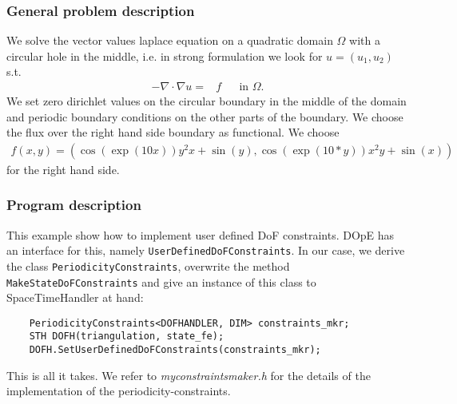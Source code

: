 \subsubsection{General problem description}
We solve the vector values laplace equation on a quadratic domain $\Omega$ with a circular hole in the middle, i.e. in strong formulation we look for $u=(u_1,u_2)$ s.t.
\begin{align*}
-\nabla \cdot \nabla u =& f &&\text{in }\Omega.
\end{align*}
We set zero dirichlet values on the circular boundary in the middle of the domain and periodic boundary conditions on the other parts of the boundary. We choose the flux over the right hand side boundary as functional. We choose
\begin{align*}
f(x,y) = \left(\cos\left(\exp(10  x)\right)  y^2x + \sin(y), \cos\left(\exp(10 * y)\right)x^2y + \sin(x)\right)
\end{align*}
for the right hand side.
\subsubsection{Program description}
This example show how to implement user defined DoF constraints. DOpE has an interface for this, namely \texttt{UserDefinedDoFConstraints}. In our case, we derive the class \texttt{PeriodicityConstraints}, overwrite the method \texttt{MakeStateDoFConstraints} and give an instance of this class to SpaceTimeHandler at hand:
\begin{verbatim}
 	PeriodicityConstraints<DOFHANDLER, DIM> constraints_mkr;
 	STH DOFH(triangulation, state_fe);
 	DOFH.SetUserDefinedDoFConstraints(constraints_mkr);
\end{verbatim}
This is all it takes. We refer to \textit{myconstraintsmaker.h} for the details of the implementation of the periodicity-constraints.
